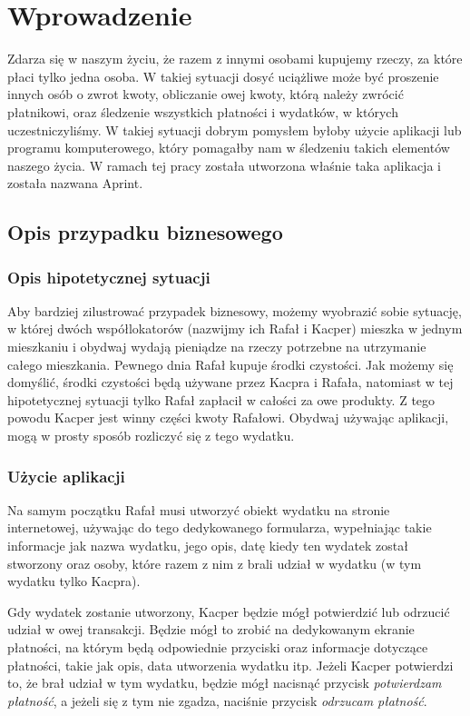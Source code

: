 \newpage %
\section{Wprowadzenie}

Zdarza się w naszym życiu, że razem z innymi osobami kupujemy rzeczy, za które płaci tylko jedna osoba. W takiej sytuacji dosyć uciążliwe może być proszenie innych osób o zwrot kwoty, obliczanie owej kwoty, którą należy zwrócić płatnikowi, oraz śledzenie wszystkich płatności i wydatków, w których uczestniczyliśmy. W takiej sytuacji dobrym pomysłem byłoby użycie aplikacji lub programu komputerowego, który pomagałby nam w śledzeniu takich elementów naszego życia. W ramach tej pracy została utworzona właśnie taka aplikacja i została nazwana Aprint.

\subsection{Opis przypadku biznesowego}
\subsubsection{Opis hipotetycznej sytuacji}

Aby bardziej zilustrować przypadek biznesowy, możemy wyobrazić sobie sytuację, w której dwóch współlokatorów (nazwijmy ich Rafał i Kacper) mieszka w jednym mieszkaniu i obydwaj wydają pieniądze na rzeczy potrzebne na utrzymanie całego mieszkania. Pewnego dnia Rafał kupuje środki czystości. Jak możemy się domyślić, środki czystości będą używane przez Kacpra i Rafała, natomiast w tej hipotetycznej sytuacji tylko Rafał zapłacił w całości za owe produkty. Z tego powodu Kacper jest winny części kwoty Rafałowi. Obydwaj używając aplikacji, mogą w prosty sposób rozliczyć się z tego wydatku.

\subsubsection{Użycie aplikacji}

Na samym początku Rafał musi utworzyć obiekt wydatku na stronie internetowej, używając do tego dedykowanego formularza, wypełniając takie informacje jak nazwa wydatku, jego opis, datę kiedy ten wydatek został stworzony oraz osoby, które razem z nim z brali udział w wydatku (w tym wydatku tylko Kacpra).

Gdy wydatek zostanie utworzony, Kacper będzie mógł potwierdzić lub odrzucić udział w owej transakcji. Będzie mógł to zrobić na dedykowanym ekranie płatności, na którym będą odpowiednie przyciski oraz informacje dotyczące płatności, takie jak opis, data utworzenia wydatku itp. Jeżeli Kacper potwierdzi to, że brał udział w tym wydatku, będzie mógł nacisnąć przycisk \emph{potwierdzam płatność}, a jeżeli się z tym nie zgadza, naciśnie przycisk \emph{odrzucam płatność}.

